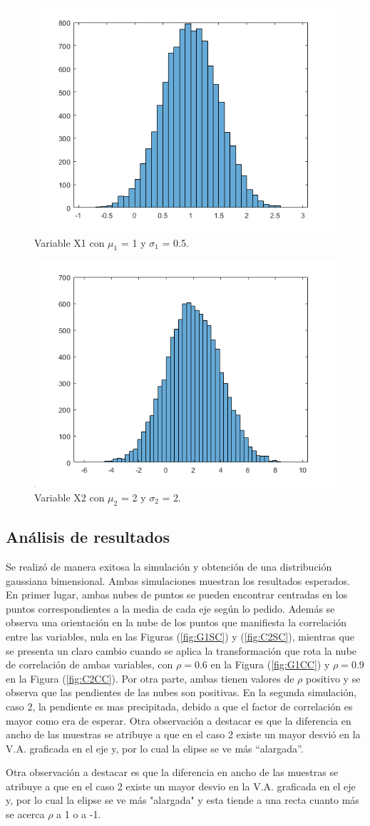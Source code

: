\begin{figure}[H]
	\centering
	\includegraphics[width=0.5\linewidth]{./ImagenesEjercicio2/X1b.PNG}
	\caption{Variable X1 con $\mu_1$ = 1 y $\sigma_1$ = 0.5.}
	\label{fig:X1b}
\end{figure}
\begin{figure}[H]
	\centering
	\includegraphics[width=0.5\linewidth]{./ImagenesEjercicio2/X2b.PNG}
	\caption{Variable X2 con $\mu_2$ = 2 y $\sigma_2$ = 2.}
	\label{fig:X2b}
\end{figure}

\subsection*{Análisis de resultados}

Se realizó de manera exitosa la simulación y obtención de una distribución gaussiana bimensional. Ambas simulaciones muestran los resultados esperados. En primer lugar, ambas nubes de puntos se pueden encontrar centradas en los puntos correspondientes a la media de cada eje según lo pedido.
Además se observa una orientación en la nube de los puntos que manifiesta la correlación entre las variables, nula en las Figuras (\ref{fig:G1SC}) y (\ref{fig:C2SC}), mientras que se presenta un claro cambio cuando se aplica la transformación que rota la nube de correlación de ambas variables, con $\rho=0.6$ en la Figura (\ref{fig:G1CC}) y $\rho= 0.9$ en la Figura (\ref{fig:C2CC}).
Por otra parte, ambas tienen valores de $\rho$ positivo y se observa que las pendientes de las nubes son positivas. En la segunda simulación, caso 2, la pendiente es mas precipitada, debido a que el factor de correlación es mayor como era de esperar.
Otra observación a destacar es que la diferencia en ancho de las muestras se atribuye a que en el caso 2 existe un mayor desvió en la V.A. graficada en el eje y, por lo cual la elipse se ve más ``alargada''.

Otra observación a destacar es que la diferencia en ancho de las muestras se atribuye a que en el caso 2 existe un mayor desvio en la V.A. graficada en el eje y, por lo cual la elipse se ve más "alargada" y esta tiende a una recta cuanto más se acerca $\rho$ a 1 o a -1.
